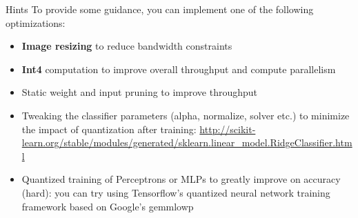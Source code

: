 Hints To provide some guidance, you can implement one of the following optimizations:

\begin{itemize}
    \item \textbf{Image resizing} to reduce bandwidth constraints
    \item \textbf{Int4} computation to improve overall throughput and compute parallelism
    \item Static weight and input pruning to improve throughput
    \item Tweaking the classifier parameters (alpha, normalize, solver etc.) to minimize the impact of quantization after training: \url{http://scikit-learn.org/stable/modules/generated/sklearn.linear_model.RidgeClassifier.html}
    \item Quantized training of Perceptrons or MLPs to greatly improve on accuracy (hard): you can try using Tensorflow's quantized neural network training framework based on Google's gemmlowp
\end{itemize}
